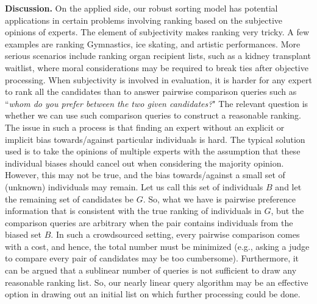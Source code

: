 \documentclass[11pt]{llncs}
\begin{document}
\noindent
{\bf{Discussion.}} On the applied side, our robust sorting model has potential applications in certain problems involving ranking based on the subjective opinions of experts. The element of subjectivity makes ranking very tricky. A few examples are ranking Gymnastics, ice skating, and artistic performances. More serious scenarios include ranking organ recipient lists, such as a kidney transplant waitlist, where moral considerations may be required to break ties after objective processing. When subjectivity is involved in evaluation, it is harder for any expert to rank all the candidates than to answer pairwise comparison queries such as ``{\em whom do you prefer between the two given candidates?}" The relevant question is whether we can use such comparison queries to construct a reasonable ranking. The issue in such a process is that finding an expert without an explicit or implicit bias towards/against particular individuals is hard. The typical solution used is to take the opinions of multiple experts with the assumption that these individual biases should cancel out when considering the majority opinion. However, this may not be true, and the bias towards/against a small set of (unknown) individuals may remain. Let us call this set of individuals $B$ and let the remaining set of candidates be $G$. So, what we have is pairwise preference information that is consistent with the true ranking of individuals in $G$, but the comparison queries are arbitrary when the pair contains individuals from the biased set $B$. In such a crowdsourced setting, every pairwise comparison comes with a cost, and hence, the total number must be minimized (e.g., asking a judge to compare every pair of candidates may be too cumbersome). Furthermore, it can be argued that a sublinear number of queries is not sufficient to draw any reasonable ranking list. So, our nearly linear query algorithm may be an effective option in drawing out an initial list on which further processing could be done.









\newpage
\end{document}
